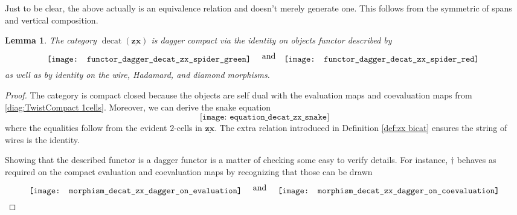 \documentclass[11pt]{amsart}
\newtheorem{lem}[thm]{Lemma}
\theoremstyle{remark}
\theoremstyle{definition}
\newcommand{\bicat}[1]{\underline{\mathbf{#1}}}
\begin{document}
Just to be clear, the above actually is an equivalence relation and doesn't merely generate one.  This follows from the symmetric of spans and vertical composition.   

\begin{lem}
	The category $\operatorname{decat}(\bicat{zx})$ is dagger compact via the identity on objects functor described by 
	\[
	\raisebox{-0.5\height}{%
	\texttt{[image: functor\_dagger\_decat\_zx\_spider\_green]}
	}
	\quad \text{and} \quad
	\raisebox{-0.5\height}{%
	\texttt{[image: functor\_dagger\_decat\_zx\_spider\_red]}
	}
	\]
	as well as by identity on the wire, Hadamard, and diamond morphisms.
\end{lem}
\begin{proof}
	The category is compact closed because the objects are self dual with the evaluation maps and coevaluation maps from \eqref{diag:TwistCompact 1cells}.  Moreover, we can derive the snake equation
	\[
		\texttt{[image: equation\_decat\_zx\_snake]}
	\]
	where the equalities follow from the evident $2$-cells in $\bicat{zx}$. The extra relation introduced in Definition \ref{def:zx bicat} ensures the string of wires is the identity. 
	
	 Showing that the described functor is a dagger functor is a matter of checking some easy to verify details. For instance, $\dagger$ behaves as required on the compact evaluation and coevaluation maps by recognizing that those can be drawn
	\[
	\raisebox{-0.5\height}{
	\texttt{[image: morphism\_decat\_zx\_dagger\_on\_evaluation]}
	}
	\quad \text{and} \quad 	
	\raisebox{-0.5\height}{
	\texttt{[image: morphism\_decat\_zx\_dagger\_on\_coevaluation]}
	}
	\qedhere
	\]
\end{proof}
\end{document}
